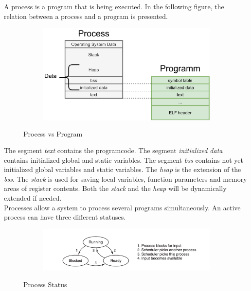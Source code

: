 A process is a program that is being executed. In the following figure, the relation between a process and a program is presented.

\begin{figure}[H]
  \centering
  \begin{subfigure}[b]{1.0\textwidth}
    \includegraphics[width=1.0\linewidth]{img/process-program.png}
  \end{subfigure}
  \caption{Process vs Program \cite{Schoettner:bs18:4.5}}
  \label{process-program}
\end{figure}

The segment \textit{text} contains the programcode.
The segment \textit{initialized data} contains initialized global and static variables.
The segment \textit{bss} contains not yet initialized global variables and static variables.
The \textit{heap} is the extension of the \textit{bss}.
The \textit{stack} is used for saving local variables, function parameters and memory areas of register contents.
Both the \textit{stack} and the \textit{heap} will be dynamically extended if needed.\cite{Schoettner:bs18:4.5}
\\
Processes allow a system to process several programs simultaneously. An active process can have three different statuses.
\\
\begin{figure}[H]
  \centering
  \begin{subfigure}[b]{1.0\textwidth}
    \includegraphics[width=1.0\linewidth]{img/prozess-status.png}
  \end{subfigure}
  \caption{Process Status \cite{Tannenbaum:93}}
  \label{process-status}
\end{figure}

